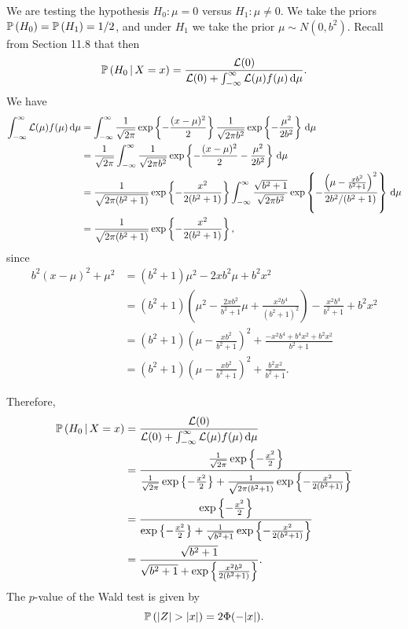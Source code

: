 \begin{ex}
  We are testing the hypothesis $H_0:\mu=0$ versus $H_1:\mu\neq 0$. We take the
  priors $\P{H_0}=\P{H_1}=1/2$, and under $H_1$ we take the prior
  $\mu\sim N(0, b^2)$. Recall from Section 11.8 that then
  \begin{align*}
    \cP{H_0}{X=x}
    =\frac{\L(0)}{\L(0)+\int_{-\infty}^\infty \L(\mu)f(\mu)\,\d{\mu}}.
  \end{align*}
  We have
  \begin{align*}
    \int_{-\infty}^\infty \L(\mu)f(\mu)\,\d\mu
     & =\int_{-\infty}^\infty \frac{1}{\sqrt{2\pi}}\exp\left\{-\frac{(x-\mu)^2}{2}\right\}
    \frac{1}{\sqrt{2\pi b^2}}\exp\left\{-\frac{\mu^2}{2b^2}\right\}\,\d\mu                 \\
     & =\frac{1}{\sqrt{2\pi}}
    \int_{-\infty}^\infty\frac{1}{\sqrt{2\pi b^2}}
    \exp\left\{-\frac{(x-\mu)^2}{2}-\frac{\mu^2}{2b^2}\right\}\,\d\mu                      \\
     & =\frac{1}{\sqrt{2\pi(b^2+1)}}
    \exp\left\{-\frac{x^2}{2(b^2+1)}\right\}
    \int_{-\infty}^\infty\frac{\sqrt{b^2+1}}{\sqrt{2\pi b^2}}
    \exp\left\{
    -\frac{\left(\mu-\frac{xb^2}{b^2+1}\right)^2}{2b^2/(b^2+1)}
    \right\}\,\d\mu                                                                        \\
     & =\frac{1}{\sqrt{2\pi(b^2+1)}}\exp\left\{-\frac{x^2}{2(b^2+1)}\right\},
  \end{align*}
  since
  \begin{align*}
    b^2(x-\mu)^2+\mu^2
     & =(b^2+1)\mu^2-2xb^2\mu+b^2x^2                                              \\
     & =(b^2+1)\left(\mu^2-\frac{2xb^2}{b^2+1}\mu+\frac{x^2b^4}{(b^2+1)^2}\right)
    -\frac{x^2b^4}{b^2+1}+b^2x^2                                                  \\
     & =(b^2+1)\left(\mu-\frac{xb^2}{b^2+1}\right)^2
    +\frac{-x^2b^4+b^4x^2+b^2x^2}{b^2+1}                                          \\
     & =(b^2+1)\left(\mu-\frac{xb^2}{b^2+1}\right)^2
    +\frac{b^2x^2}{b^2+1}.
  \end{align*}

  Therefore,
  \begin{align*}
    \cP{H_0}{X=x}
     & =\frac{\L(0)}{\L(0)+\int_{-\infty}^\infty \L(\mu)f(\mu)\,\d{\mu}}              \\
     & =\frac{\frac{1}{\sqrt{2\pi}}\exp\left\{-\frac{x^2}{2}\right\}}{
      \frac{1}{\sqrt{2\pi}}\exp\left\{-\frac{x^2}{2}\right\}
      +\frac{1}{\sqrt{2\pi(b^2+1)}}\exp\left\{-\frac{x^2}{2(b^2+1)}\right\}
    }                                                                                 \\
     & =\frac{\exp\left\{-\frac{x^2}{2}\right\}}{
      \exp\left\{-\frac{x^2}{2}\right\}
      +\frac{1}{\sqrt{b^2+1}}\exp\left\{-\frac{x^2}{2(b^2+1)}\right\}}                \\
     & =\frac{\sqrt{b^2+1}}{\sqrt{b^2+1}+\exp\left\{\frac{x^2b^2}{2(b^2+1)}\right\}}.
  \end{align*}
  The $p$-value of the Wald test is given by
  \[
    \P{|Z|>|x|}=2\Phi(-|x|).
  \]


\end{ex}
